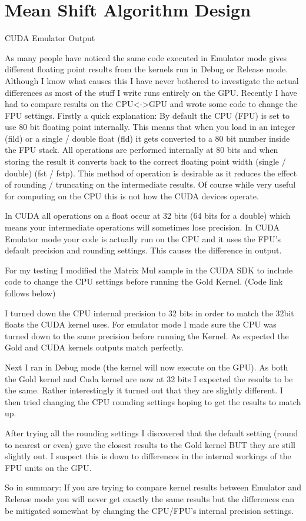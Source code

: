 \chapter{Mean Shift Algorithm Design} %
\label{cha:algorithm_design}


CUDA Emulator Output

As many people have noticed the same code executed in Emulator mode gives
different floating point results from the kernels run in Debug or Release mode.
Although I know what causes this I have never bothered to investigate the actual
differences as most of the stuff I write runs entirely on the GPU. Recently I
have had to compare results on the CPU<->GPU and wrote some code to change the
FPU settings. Firstly a quick explanation: By default the CPU (FPU) is set to
use 80 bit floating point internally. This means that when you load in an
integer (fild) or a single / double float (fld) it gets converted to a 80 bit
number inside the FPU stack. All operations are performed internally at 80 bits
and when storing the result it converts back to the correct floating point width
(single / double) (fst / fstp). This method of operation is desirable as it
reduces the effect of rounding / truncating on the intermediate results. Of
course while very useful for computing on the CPU this is not how the CUDA
devices operate.

 In CUDA all operations on a float occur at 32 bits (64 bits for a double) which
means your intermediate operations will sometimes lose precision. In CUDA
Emulator mode your code is actually run on the CPU and it uses the FPU’s default
precision and rounding settings. This causes the difference in output.

 For my testing I modified the Matrix Mul sample in the CUDA SDK to include code
to change the CPU settings before running the Gold Kernel. (Code link follows
below)

 I turned down the CPU internal precision to 32 bits in order to match the 32bit
floats the CUDA kernel uses. For emulator mode I made sure the CPU was turned
down to the same precision before running the Kernel. As expected the Gold and
CUDA kernels outputs match perfectly.

 Next I ran in Debug mode (the kernel will now execute on the GPU). As both the
Gold kernel and Cuda kernel are now at 32 bits I expected the results to be the
same. Rather interestingly it turned out that they are slightly different. I
then tried changing the CPU rounding settings hoping to get the results to match
up.

 After trying all the rounding settings I discovered that the default setting
(round to nearest or even) gave the closest results to the Gold kernel BUT they
are still slightly out. I suspect this is down to differences in the internal
workings of the FPU units on the GPU.

 So in summary: If you are trying to compare kernel results between Emulator and
Release mode you will never get exactly the same results but the differences can
be mitigated somewhat by changing the CPU/FPU’s internal precision settings.
